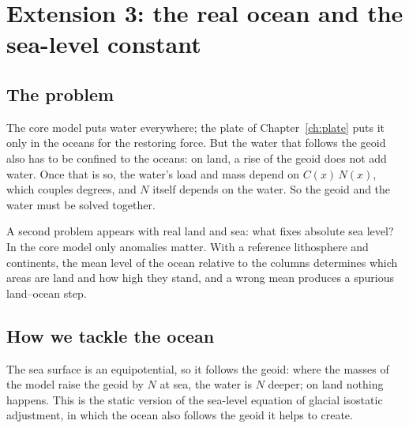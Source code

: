 \chapter{Extension 3: the real ocean and the sea-level constant}
\label{ch:ocean}

\section{The problem}

The core model puts water everywhere; the plate of Chapter~\ref{ch:plate} puts it only in the oceans for the restoring force.
But the water that follows the geoid also has to be confined to the oceans: on land, a rise of the geoid does not add water.
Once that is so, the water's load and mass depend on $C(x)\,N(x)$, which couples degrees, and $N$ itself depends on the water.
So the geoid and the water must be solved together.

A second problem appears with real land and sea: what fixes absolute sea level?
In the core model only anomalies matter.
With a reference lithosphere and continents, the mean level of the ocean relative to the columns determines which areas are land and how high they stand, and a wrong mean produces a spurious land--ocean step.

\section{How we tackle the ocean}

The sea surface is an equipotential, so it follows the geoid: where the masses of the model raise the geoid by $N$ at sea, the water is $N$ deeper; on land nothing happens.
This is the static version of the sea-level equation of glacial isostatic adjustment, in which the ocean also follows the geoid it helps to create.

